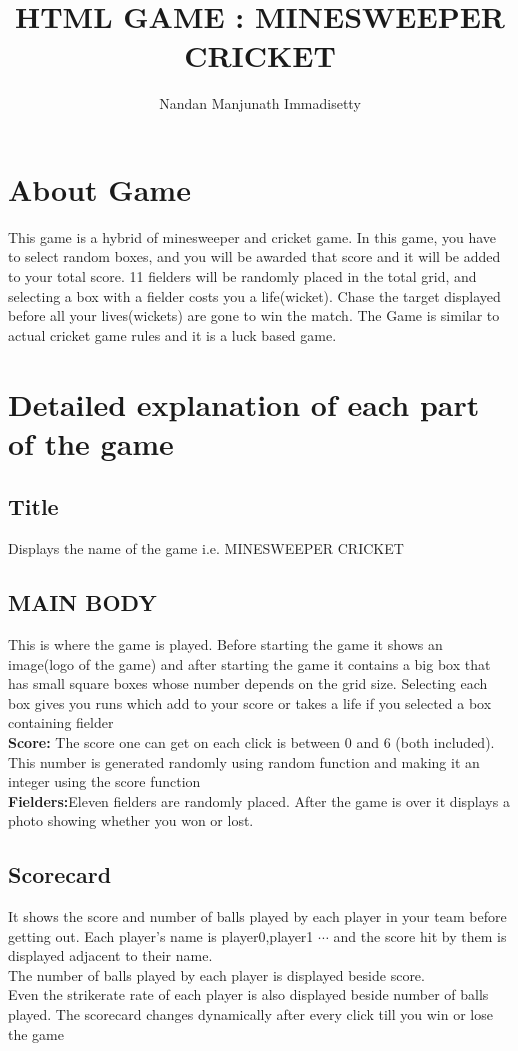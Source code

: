 \documentclass{article}
\title{HTML GAME : MINESWEEPER CRICKET}
\author{Nandan Manjunath Immadisetty}
\date{}
\begin{document}
\maketitle

\section{About Game}
This game is a hybrid of minesweeper and cricket game. In this game, you have to select random boxes, and you will be awarded that score  and it will be added to your total score. 11 fielders will be randomly placed in the total grid, and selecting a box with a fielder costs you a life(wicket). Chase the target displayed before all your lives(wickets) are gone to win the match.
The Game is similar to actual cricket game rules and it is a luck based game.

\section{Detailed explanation of each part of the game}
\subsection{Title}
Displays the name of the game i.e. MINESWEEPER CRICKET
\subsection{MAIN BODY}
This is where the game is played. Before starting the game it shows an image(logo of the game) and after starting the game it contains a big box that has small square boxes whose number depends on the grid size. Selecting each box gives you runs which add to your score or takes a life if you selected a box containing fielder\\
\textbf{Score:} The score one can get on each click is between 0 and 6 (both included). This number is generated randomly using random function and making it an integer using the score function\\
\textbf{Fielders:}Eleven fielders are randomly placed.
After the game is over it displays a photo showing whether you won or lost.
\subsection{Scorecard}
It shows the score and number of balls played by each player in your team before getting out.
Each player's name is player0,player1 $\cdots$ and the score hit by them is displayed adjacent to their name.\\
The number of balls played by each player is displayed beside score.\\
Even the strikerate rate of each player is also displayed beside number of balls played.
The scorecard changes dynamically after every click till you win or lose the game
\end{document}
